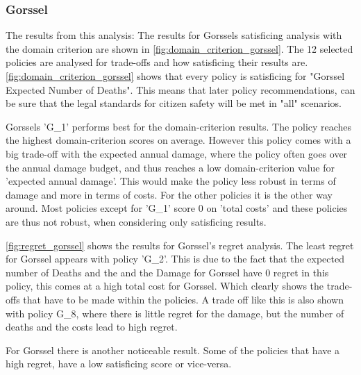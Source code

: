 \subsubsection{Gorssel}
The results from this analysis: The results for Gorssels satisficing analysis with the domain criterion are shown in \autoref{fig:domain_criterion_gorssel}. The 12 selected policies are analysed for trade-offs and how satisficing their results are. \newline
\autoref{fig:domain_criterion_gorssel} shows that every policy is satisficing for "Gorssel Expected Number of Deaths". This means that later policy recommendations, can be sure that the legal standards for citizen safety will be met in "all" scenarios. \newline

\noindent Gorssels 'G\_1' performs best for the domain-criterion results. The policy reaches the highest domain-criterion scores on average. However this policy comes with a big trade-off with the expected annual damage, where the policy often goes over the annual damage budget, and thus reaches a low domain-criterion value for 'expected annual damage'. This would make the policy less robust in terms of damage and more in terms of costs. For the other policies it is the other way around. Most policies except for 'G\_1' score 0 on 'total costs' and these policies are thus not robust, when considering only satisficing results.  \newline

\noindent \autoref{fig:regret_gorssel} shows the results for Gorssel's regret analysis. The least regret for Gorssel appears with policy 'G\_2'. This is due to the fact that the expected number of Deaths and the and the Damage for Gorssel have 0 regret in this policy, this comes at a high total cost for Gorssel. Which clearly shows the trade-offs that have to be made within the policies. A trade off like this is also shown with policy G\_8, where there is little regret for the damage, but the number of deaths and the costs lead to high regret.

\noindent For Gorssel there is another noticeable result. Some of the policies that have a high regret, have a low satisficing score or vice-versa.

